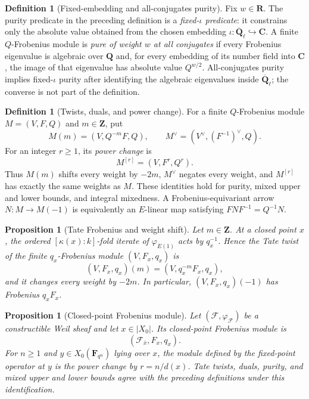 \documentclass[10pt]{article}
\newtheorem{proposition}[theorem]{Proposition}
\theoremstyle{definition}
\newtheorem{definition}[theorem]{Definition}
\newcommand{\Qlb}{\overline{\mathbf Q}_\ell}
\begin{document}
\begin{definition}[Fixed-embedding and all-conjugates purity]
Fix \(w\in\mathbf R\).
The purity predicate in the preceding definition is a
\emph{fixed-\(\iota\) predicate}: it constrains only the absolute value
obtained from the chosen embedding \(\iota:\Qlb\hookrightarrow\mathbf C\).
A finite \(Q\)-Frobenius module is \emph{pure of weight \(w\) at all
conjugates} if every Frobenius eigenvalue is algebraic over \(\mathbf Q\)
and, for every embedding of its number field into \(\mathbf C\), the image
of that eigenvalue has absolute value \(Q^{w/2}\).  All-conjugates purity
implies fixed-\(\iota\) purity after identifying the algebraic eigenvalues
inside \(\Qlb\); the converse is not part of the definition.
\end{definition}

\begin{definition}[Twists, duals, and power change]
For a finite \(Q\)-Frobenius module \(M=(V,F,Q)\) and \(m\in\mathbf Z\), put
\[
 M(m)=(V,Q^{-m}F,Q),\qquad
 M^\vee=(V^\vee,(F^{-1})^\vee,Q).
\]
For an integer \(r\geq1\), its \emph{power change} is
\[
                         M^{[r]}=(V,F^r,Q^r).
\]
Thus \(M(m)\) shifts every weight by \(-2m\), \(M^\vee\) negates every
weight, and \(M^{[r]}\) has exactly the same weights as \(M\).  These
identities hold for purity, mixed upper and lower bounds, and integral
mixedness.  A Frobenius-equivariant arrow \(N:M\to M(-1)\) is equivalently
an \(E\)-linear map satisfying \(FNF^{-1}=Q^{-1}N\).
\end{definition}

\begin{proposition}[Tate Frobenius and weight shift]
Let \(m\in\mathbf Z\).  At a closed point \(x\), the ordered
\([\kappa(x):k]\)-fold iterate of \(\varphi_{E(1)}\) acts by
\(q_x^{-1}\).  Hence the Tate twist of the finite \(q_x\)-Frobenius module
\((V,F_x,q_x)\) is
\[
                   (V,F_x,q_x)(m)=(V,q_x^{-m}F_x,q_x),
\]
and it changes every weight by \(-2m\).  In particular,
\((V,F_x,q_x)(-1)\) has Frobenius \(q_xF_x\).
\end{proposition}

\begin{proposition}[Closed-point Frobenius module]
Let \((\mathcal F,\varphi_{\mathcal F})\) be a constructible Weil sheaf and
let \(x\in|X_0|\).  Its closed-point Frobenius module is
\[
                       (\mathcal F_{\bar x},F_x,q_x).
\]
For \(n\geq1\) and \(y\in X_0(\mathbf F_{q^n})\) lying over \(x\), the module defined by
the fixed-point operator at \(y\) is the power change by
\(r=n/d(x)\).  Tate twists, duals, purity, and mixed upper and lower bounds
agree with the preceding definitions under this identification.
\end{proposition}
\end{document}
